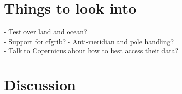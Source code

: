 \documentclass[a4paper,11pt]{article}
\begin{document}
\section*{Things to look into}

- Test over land and ocean? \\
- Support for cfgrib?
- Anti-meridian and pole handling? \\
- Talk to Copernicus about how to best access their data? \\

\section{Discussion}



\end{document}

